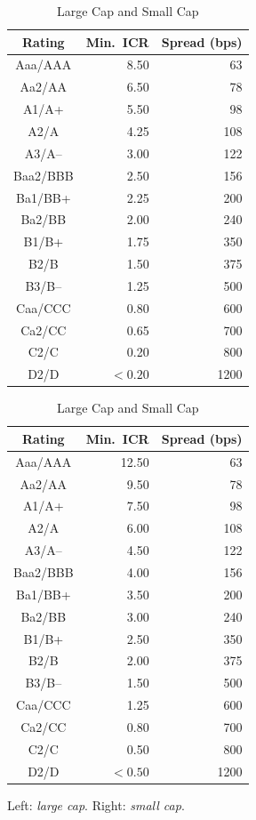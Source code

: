 \documentclass[12pt, a4paper, oneside]{book}
\begin{document}
\begin{table}[h]
\centering
\caption{Large Cap and Small Cap}
\begin{tabular}{crr}
\toprule
\textbf{Rating} & \textbf{Min.\ ICR} & \textbf{Spread (bps)} \\
\midrule
Aaa/AAA & 8.50 & 63 \\
Aa2/AA  & 6.50 & 78 \\
A1/A+   & 5.50 & 98 \\
A2/A    & 4.25 & 108 \\
A3/A--  & 3.00 & 122 \\
Baa2/BBB & 2.50 & 156 \\
Ba1/BB+ & 2.25 & 200 \\
Ba2/BB  & 2.00 & 240 \\
B1/B+   & 1.75 & 350 \\
B2/B    & 1.50 & 375 \\
B3/B--  & 1.25 & 500 \\
Caa/CCC & 0.80 & 600 \\
Ca2/CC  & 0.65 & 700 \\
C2/C    & 0.20 & 800 \\
D2/D    & $<0.20$ & 1200 \\
\bottomrule
\end{tabular}
\quad
\begin{tabular}{crr}
\toprule
\textbf{Rating} & \textbf{Min.\ ICR} & \textbf{Spread (bps)} \\
\midrule
Aaa/AAA & 12.50 & 63 \\
Aa2/AA  &  9.50 & 78 \\
A1/A+   &  7.50 & 98 \\
A2/A    &  6.00 & 108 \\
A3/A--  &  4.50 & 122 \\
Baa2/BBB &  4.00 & 156 \\
Ba1/BB+ &  3.50 & 200 \\
Ba2/BB  &  3.00 & 240 \\
B1/B+   &  2.50 & 350 \\
B2/B    &  2.00 & 375 \\
B3/B--  &  1.50 & 500 \\
Caa/CCC &  1.25 & 600 \\
Ca2/CC  &  0.80 & 700 \\
C2/C    &  0.50 & 800 \\
D2/D    & $<0.50$ & 1200 \\
\bottomrule
\end{tabular}
\end{table}
\begin{center}\small Left: \emph{large cap}. \quad Right: \emph{small cap}.\end{center}
\end{document}
